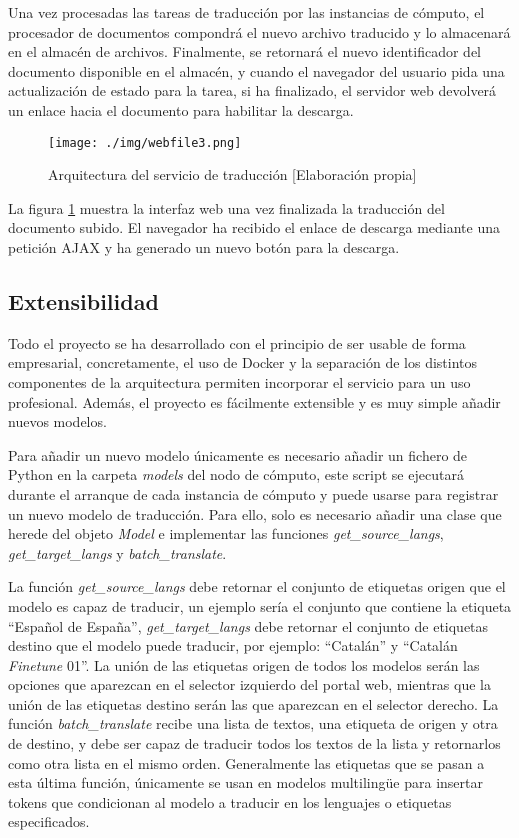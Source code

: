 Una vez procesadas las tareas de traducción por las instancias de cómputo, el procesador de documentos compondrá el nuevo archivo traducido y lo almacenará en el almacén de archivos. Finalmente, se retornará el nuevo identificador del documento disponible en el almacén, y cuando el navegador del usuario pida una actualización de estado para la tarea, si ha finalizado, el servidor web devolverá un enlace hacia el documento para habilitar la descarga.

\begin{figure}[H]
    \centering
    \texttt{[image: ./img/webfile3.png]}
    \caption{Arquitectura del servicio de traducción [Elaboración propia]}\label{webfile3}
\end{figure}

La figura \ref{webfile3} muestra la interfaz web una vez finalizada la traducción del documento subido. El navegador ha recibido el enlace de descarga mediante una petición AJAX y ha generado un nuevo botón para la descarga.

\subsection{Extensibilidad}
Todo el proyecto se ha desarrollado con el principio de ser usable de forma empresarial, concretamente, el uso de Docker y la separación de los distintos componentes de la arquitectura permiten incorporar el servicio para un uso profesional. Además, el proyecto es fácilmente extensible y es muy simple añadir nuevos modelos.

Para añadir un nuevo modelo únicamente es necesario añadir un fichero de Python en la carpeta \textit{models} del nodo de cómputo, este script se ejecutará durante el arranque de cada instancia de cómputo y puede usarse para registrar un nuevo modelo de traducción. Para ello, solo es necesario añadir una clase que herede del objeto \textit{Model} e implementar las funciones \textit{get\_source\_langs}, \textit{get\_target\_langs} y \textit{batch\_translate}.

La función \textit{get\_source\_langs} debe retornar el conjunto de etiquetas origen que el modelo es capaz de traducir, un ejemplo sería el conjunto que contiene la etiqueta ``Español de España'', \textit{get\_target\_langs} debe retornar el conjunto de etiquetas destino que el modelo puede traducir, por ejemplo: ``Catalán'' y ``Catalán \textit{Finetune} 01''.
La unión de las etiquetas origen de todos los modelos serán las opciones que aparezcan en el selector izquierdo del portal web, mientras que la unión de las etiquetas destino serán las que aparezcan en el selector derecho.
La función \textit{batch\_translate} recibe una lista de textos, una etiqueta de origen y otra de destino, y debe ser capaz de traducir todos los textos de la lista y retornarlos como otra lista en el mismo orden. Generalmente las etiquetas que se pasan a esta última función, únicamente se usan en modelos multiling{\"u}e para insertar tokens que condicionan al modelo a traducir en los lenguajes o etiquetas especificados.